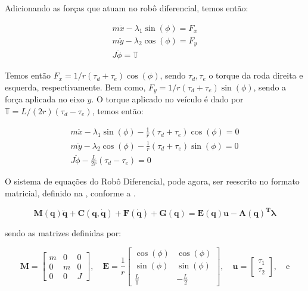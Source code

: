 Adicionando as forças que atuam no robô diferencial, temos então:

\begin{equation}
    \begin{split}
    m\ddot{x} - \lambda_1 \sin(\phi) = F_x \\
    m\ddot{y} - \lambda_2 \cos(\phi) = F_y \\
    J\ddot{\phi} = \mathbb{T}
    \end{split}
\end{equation}

Temos então $F_x = 1/r\left( \tau_{d}+ \tau_{e}\right)\cos(\phi)$, sendo $\tau_d, \tau_e$ o torque da roda direita e esquerda, respectivamente.
Bem como, $F_y = 1/r\left( \tau_{d}+ \tau_{e}\right)\sin(\phi)$, sendo a força aplicada no eixo $y$. O torque aplicado no veículo é dado por $\mathbb{T}= L/(2r)\left( \tau_d - \tau_e \right)$,
temos então:

\begin{equation}
    \begin{split}
        m\ddot{x} - \lambda_1 \sin(\phi) - \frac{1}{r}\left( \tau_d + \tau_e \right) \cos(\phi)= 0 \\
        m\ddot{y} - \lambda_2 \cos(\phi) - \frac{1}{r}\left( \tau_d + \tau_e \right) \sin(\phi)= 0 \\
        J\ddot{\phi} - \frac{L}{2r}\left( \tau_d - \tau_e \right)= 0
    \end{split}
\end{equation}

O sistema de equações do Robô Diferencial, pode agora, ser reescrito no formato matricial, definido na , conforme a .

\begin{equation}
    \mathbf{M(q)\ddot{q}}+ \mathbf{C(q, \dot{q})}+ \mathbf{F(\dot{q})}+ \mathbf{G(q)} = \mathbf{E(q)u}
    - \mathbf{A(q)^T}\boldsymbol{\lambda}
    \label{eq:rmrestri2}
\end{equation}

sendo as matrizes definidas por:

\begin{equation*}
    \mathbf{M} = 
    \begin{bmatrix}
        m & 0 & 0 \\
        0 & m & 0 \\
        0 & 0 & J
    \end{bmatrix}, \quad
    \mathbf{E} = \frac{1}{r}
    \begin{bmatrix}
        \cos(\phi) & \cos(\phi) \\
        \sin(\phi) & \sin(\phi) \\
        \frac{L}{1} & -\frac{L}{2}
    \end{bmatrix}, \quad 
    \mathbf{u} = 
    \begin{bmatrix}
        \tau_1 \\
        \tau_2
    \end{bmatrix}, \quad \text{e}
\end{equation*}

